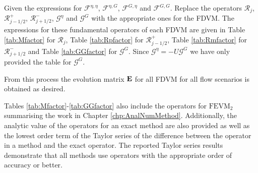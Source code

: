 Given the expressions for $\mathcal{F}^{\eta,\eta} $, $\mathcal{F}^{\eta,G}$, $\mathcal{F}^{G,\eta} $ and $\mathcal{F}^{G,G} $. Replace the operators $\mathcal{R}_j$, $\mathcal{R}^+_{j-1/2}$, $\mathcal{R}^-_{j+1/2}$, $\mathcal{G}^\eta$ and $\mathcal{G}^G$ with the appropriate ones for the FDVM. The expressions for these fundamental operators of each FDVM are given in Table \ref{tab:Mfactor} for $\mathcal{R}_j$, Table \ref{tab:Rpfactor} for $\mathcal{R}^+_{j-1/2}$, Table \ref{tab:Rmfactor} for $\mathcal{R}^-_{j+1/2}$ and Table \ref{tab:GGfactor} for $\mathcal{G}^G$. Since $\mathcal{G}^\eta = -U\mathcal{G}^G $ we have only provided the table for $\mathcal{G}^G$. 

From this process the evolution matrix $\mathbf{E}$ for all FDVM for all flow scenarios is obtained as desired. 

Tables \ref{tab:Mfactor}-\ref{tab:GGfactor} also include the operators for $\text{FEVM}_2$ summarising the work in Chapter \ref{chp:AnalNumMethod}. Additionally, the analytic value of the operators for an exact method are also provided as well as the lowest order term of the Taylor series of the difference between the operator in a method and the exact operator. The reported Taylor series results demonstrate that all methods use operators with the appropriate order of accuracy or better. 

